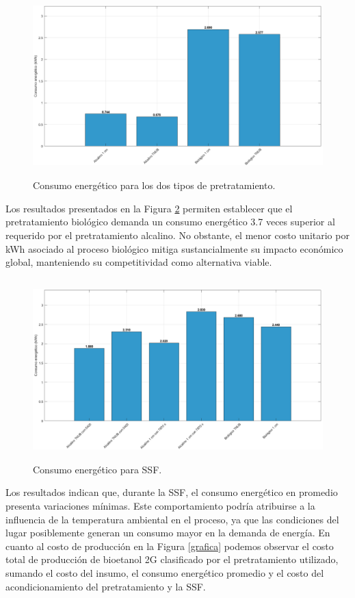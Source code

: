 \documentclass[12pt]{article}
\begin{document}
						\begin{figure} [H]
				\centering
				\includegraphics[width=16cm, height=7cm]{imagenes/consumoenergetico}
				\caption{Consumo energético para los dos tipos de pretratamiento. }
				\label{grafica3}
			\end{figure}
			
		Los resultados presentados en la Figura \ref{grafica1} permiten establecer que el pretratamiento biológico demanda un consumo energético 3.7 veces superior al requerido por el pretratamiento alcalino. No obstante, el menor costo unitario por kWh asociado al proceso biológico mitiga sustancialmente su impacto económico global, manteniendo su competitividad como alternativa viable.

\begin{figure} [H]
	\centering
	\includegraphics[width=16cm, height=7cm]{imagenes/CONSUMOENERGETICOSSF}
	\caption{Consumo energético para SSF. }
	\label{grafica1}
\end{figure}


Los resultados indican que, durante la SSF, el consumo energético en promedio presenta variaciones mínimas. Este comportamiento podría atribuirse a la influencia de la temperatura ambiental en el proceso, ya que las condiciones del lugar posiblemente generan un consumo mayor en la demanda de energía.
En cuanto al costo de producción en la Figura \ref{grafica} podemos observar el costo total de producción de bioetanol 2G clasificado por el pretratamiento utilizado, sumando el costo del insumo, el consumo energético promedio y el costo del acondicionamiento del pretratamiento y la SSF.
\end{document}
